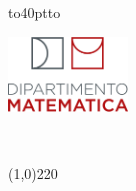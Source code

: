 \documentclass[12pt,a4paper,twoside,openright,english]{book}
\title{\myTitle}
\author{\myName}
\date{\today}
\begin{document}
\frontmatter
\begin{titlepage}
	\begin{center}
		\vbox to40pt{\vbox to}
	\end{center}
	\begin{minipage}{.20\textwidth}
		\includegraphics[height=2cm]{logo-department.png}
	\end{minipage}
	\hspace{40pt}
	\begin{minipage}{.80\textwidth}
		\begin{center}
			\begin{LARGE}
				\textsc{\textbf{\myUni}}\\
			\end{LARGE}
			\line(1,0){220}\\
			\begin{Large}
				\textsc{\myDepartment}\\
			\end{Large}
		\end{center}
	\end{minipage}
	\begin{center}
		\vfill
		\large{\textsc{\myDegree}}\\			

\end{center}
\end{titlepage}
\end{document}
